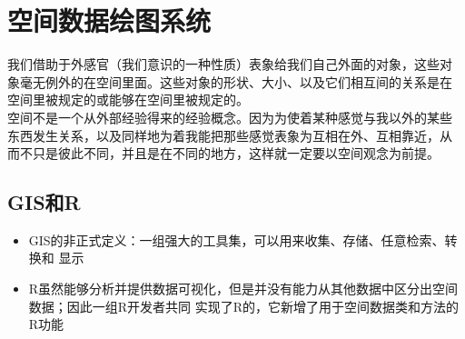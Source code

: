 
\section{空间数据绘图系统}

\begin{frame}[c]{\subsecname}{}
      \begin{ornamentblock}%
\hspace*{2em}我们借助于外感官（我们意识的一种性质）表象给我们自己外面的对象，这些对
象毫无例外的在空间里面。这些对象的形状、大小、以及它们相互间的关系是在
空间里被规定的或能够在空间里被规定的。\\
\hspace*{2em}空间不是一个从外部经验得来的经验概念。因为为使着某种感觉与我以外的某些
东西发生关系，以及同样地为着我能把那些感觉表象为互相在外、互相靠近，从
而不只是彼此不同，并且是在不同的地方，这样就一定要以空间观念为前提。\\
      \end{ornamentblock}
\end{frame}

\subsection{GIS和R}
\begin{frame}[t]{\subsecname}{}
\begin{itemize}
\item GIS的非正式定义\footnotemark[1]：一组强大的工具集，可以用来收集、存储、任意检索、转换和
显示
\item R虽然能够分析并提供数据可视化，但是并没有能力从其他数据中区分出空间数据；因此一组R开发者共同
实现了R的\footnotemark[2]，它新增了用于空间数据类和方法的R功能
\end{itemize}


\end{frame}

